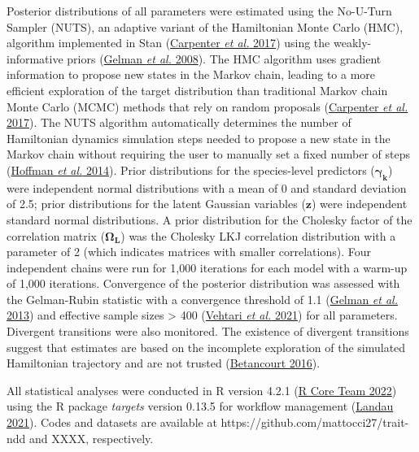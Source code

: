 \documentclass[
  12pt,
  letterpaper,
  DIV=11,
  numbers=noendperiod]{scrartcl}
\begin{document}
Posterior distributions of all parameters were estimated using the
No-U-Turn Sampler (NUTS), an adaptive variant of the Hamiltonian Monte
Carlo (HMC), algorithm implemented in Stan
(\protect\hyperlink{ref-Carpenter2017}{Carpenter \emph{et al.} 2017})
using the weakly-informative priors
(\protect\hyperlink{ref-Gelman2008}{Gelman \emph{et al.} 2008}). The HMC
algorithm uses gradient information to propose new states in the Markov
chain, leading to a more efficient exploration of the target
distribution than traditional Markov chain Monte Carlo (MCMC) methods
that rely on random proposals
(\protect\hyperlink{ref-Carpenter2017}{Carpenter \emph{et al.} 2017}).
The NUTS algorithm automatically determines the number of Hamiltonian
dynamics simulation steps needed to propose a new state in the Markov
chain without requiring the user to manually set a fixed number of steps
(\protect\hyperlink{ref-Hoffman2014}{Hoffman \emph{et al.} 2014}). Prior
distributions for the species-level predictors
(\(\boldsymbol{\gamma_k}\)) were independent normal distributions with a
mean of 0 and standard deviation of 2.5; prior distributions for the
latent Gaussian variables (\(\boldsymbol{z}\)) were independent standard
normal distributions. A prior distribution for the Cholesky factor of
the correlation matrix (\(\boldsymbol{\Omega_L}\)) was the Cholesky LKJ
correlation distribution with a parameter of 2 (which indicates matrices
with smaller correlations). Four independent chains were run for 1,000
iterations for each model with a warm-up of 1,000 iterations.
Convergence of the posterior distribution was assessed with the
Gelman-Rubin statistic with a convergence threshold of 1.1
(\protect\hyperlink{ref-Gelman2013}{Gelman \emph{et al.} 2013}) and
effective sample sizes \textgreater{} 400
(\protect\hyperlink{ref-Vehtari2021}{Vehtari \emph{et al.} 2021}) for
all parameters. Divergent transitions were also monitored. The existence
of divergent transitions suggest that estimates are based on the
incomplete exploration of the simulated Hamiltonian trajectory and are
not trusted (\protect\hyperlink{ref-Betancourt2016}{Betancourt 2016}).

All statistical analyses were conducted in R version 4.2.1
(\protect\hyperlink{ref-RCoreTeam2022}{R Core Team 2022}) using the R
package \emph{targets} version 0.13.5 for workflow management
(\protect\hyperlink{ref-Landau2021}{Landau 2021}). Codes and datasets
are available at https://github.com/mattocci27/trait-ndd and XXXX,
respectively.

\newpage
\end{document}
